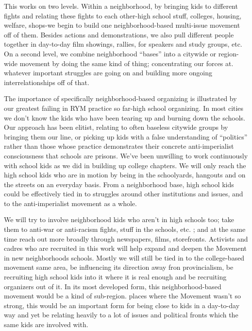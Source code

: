 \documentclass[12pt, titlepage]{article}
\begin{document}
{\begin{spacing}{1.10}
This works on two levels. Within a neighborhood, by bringing kids to different fights and relating these fights to each other-high school stuff, colleges, housing, welfare, shops-we begin to build one neighborhood-based multi-issue movement off of them. Besides actions and demonstrations, we also pull different people together in day-to-day film showings, rallies, for speakers and study groups, etc. On a second level, we combine neighborhood ``bases'' into a citywide or region-wide movement by doing the same kind of thing; concentrating our forces at. whatever important struggles are going on and building more ongoing interrelationships off of that.

The importance of specifically neighborhood-based organizing is illustrated by our greatest failing in RYM practice so far-high school organizing. In most cities we don't know the kids who have been tearing up and burning down the schools. Our approach has been elitist, relating to often baseless citywide groups by bringing them our line, or picking up kids with a false understanding of ``politics'' rather than those whose practice demonstrates their concrete anti-imperialist consciousness that schools are prisons. We've been unwilling to work continuously with school kids as we did in building up college chapters. We will only reach the high school kids who are in motion by being in the schoolyards, hangouts and on the streets on an everyday basis. From a neighborhood base, high school kids could be effectively tied in to struggles around other institutions and issues, and to the anti-imperialist movement as a whole.

We will try to involve neighborhood kids who aren't in high schools too; take them to anti-war or anti-racism fights, stuff in the schools, etc. ; and at the same time reach out more broadly through newspapers, films, storefronts. Activists and cadres who are recruited in this work will help expand and deepen the Movement in new neighborhoods schools. Mostly we will still be tied in to the college-based movement same area, be influencing its direction away fron provincialism, be recruiting high school kids into it where it is real enough and be recruiting organizers out of it. In its most developed form, this neighborhood-based movement would be a kind of sub-region. places where the Movement wasn't so strong, this would be an important form for being close to kids in a day-to-day way and yet be relating heavily to a lot of issues and political fronts which the same kids are involved with.


\end{spacing}}
\end{document}
